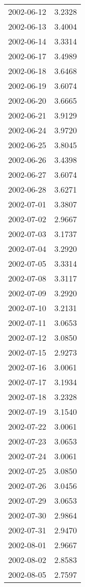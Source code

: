\begin{tabular}{lr}
2002-06-12 &      3.2328 \\
2002-06-13 &      3.4004 \\
2002-06-14 &      3.3314 \\
2002-06-17 &      3.4989 \\
2002-06-18 &      3.6468 \\
2002-06-19 &      3.6074 \\
2002-06-20 &      3.6665 \\
2002-06-21 &      3.9129 \\
2002-06-24 &      3.9720 \\
2002-06-25 &      3.8045 \\
2002-06-26 &      3.4398 \\
2002-06-27 &      3.6074 \\
2002-06-28 &      3.6271 \\
2002-07-01 &      3.3807 \\
2002-07-02 &      2.9667 \\
2002-07-03 &      3.1737 \\
2002-07-04 &      3.2920 \\
2002-07-05 &      3.3314 \\
2002-07-08 &      3.3117 \\
2002-07-09 &      3.2920 \\
2002-07-10 &      3.2131 \\
2002-07-11 &      3.0653 \\
2002-07-12 &      3.0850 \\
2002-07-15 &      2.9273 \\
2002-07-16 &      3.0061 \\
2002-07-17 &      3.1934 \\
2002-07-18 &      3.2328 \\
2002-07-19 &      3.1540 \\
2002-07-22 &      3.0061 \\
2002-07-23 &      3.0653 \\
2002-07-24 &      3.0061 \\
2002-07-25 &      3.0850 \\
2002-07-26 &      3.0456 \\
2002-07-29 &      3.0653 \\
2002-07-30 &      2.9864 \\
2002-07-31 &      2.9470 \\
2002-08-01 &      2.9667 \\
2002-08-02 &      2.8583 \\
2002-08-05 &      2.7597 \\

\end{tabular}
